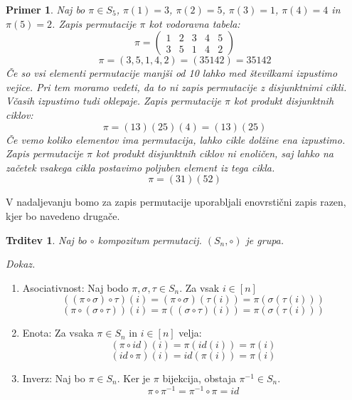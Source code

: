\documentclass[a4paper, 12pt]{book}
\newtheorem{trditev}{Trditev}[chapter]
\newtheorem{primer}{Primer}[chapter]
\newenvironment{dokaz}{\emph{Dokaz.}\ }{\hspace{\fill}{$\Box$}}
\begin{document}
\begin{primer}
    Naj bo $\pi \in S_5$, $\pi(1) = 3$, $\pi(2) = 5$, $\pi(3) = 1$, $\pi(4) = 4$ in $\pi(5) = 2$. Zapis permutacije $\pi$ kot vodoravna tabela:
    \[
        \pi = \begin{pmatrix}
            1 & 2 & 3 & 4 & 5 \\
            3 & 5 & 1 & 4 & 2
        \end{pmatrix}
    \]
    \[
        \pi = (3, 5, 1, 4, 2) = (3 5 1 4 2) = 35142
    \]
    Če so vsi elementi permutacije manjši od 10 lahko med številkami izpustimo vejice. Pri tem moramo vedeti, da to ni zapis permutacije z disjunktnimi cikli.
    Včasih izpustimo tudi oklepaje.
    Zapis permutacije $\pi$ kot produkt disjunktnih ciklov:
    \[
        \pi = (1 3)(2 5)(4) = (1 3)(2 5)
    \]
    Če vemo koliko elementov ima permutacija, lahko cikle dolžine ena izpustimo. Zapis permutacije $\pi$ kot produkt disjunktnih ciklov ni enoličen, saj lahko na začetek vsakega cikla postavimo poljuben element iz tega cikla.
    \[
        \pi = (3 1)(5 2)
    \]
\end{primer}

V nadaljevanju bomo za zapis permutacije uporabljali enovrstični zapis razen, kjer bo navedeno drugače.

\begin{trditev}
    Naj bo $\circ$ kompozitum permutacij. $(S_n, \circ)$ je grupa.
\end{trditev}
\begin{dokaz}
    \begin{enumerate}
        \item Asociativnost: Naj bodo $\pi, \sigma, \tau \in S_n$. Za vsak $i \in [n]$ 
        \[
            ((\pi \circ \sigma) \circ \tau)(i) = (\pi \circ \sigma)(\tau(i)) = \pi(\sigma(\tau(i)))
        \]
        \[
            (\pi \circ (\sigma \circ \tau))(i) = \pi((\sigma \circ \tau)(i)) = \pi(\sigma(\tau(i))) 
        \]
        \item Enota: Za vsaka $\pi \in S_n$ in $i \in [n]$ velja:
        \[
            (\pi \circ id)(i) = \pi(id(i)) = \pi(i)
        \]
        \[
            (id \circ \pi)(i) = id(\pi(i)) = \pi(i)
        \]
        \item Inverz: Naj bo $\pi \in S_n$. Ker je $\pi$ bijekcija, obstaja $\pi^{-1} \in S_n$.
        \[
            \pi \circ \pi^{-1} = \pi^{-1} \circ \pi = id
        \]
    \end{enumerate}
\end{dokaz}
\end{document}
